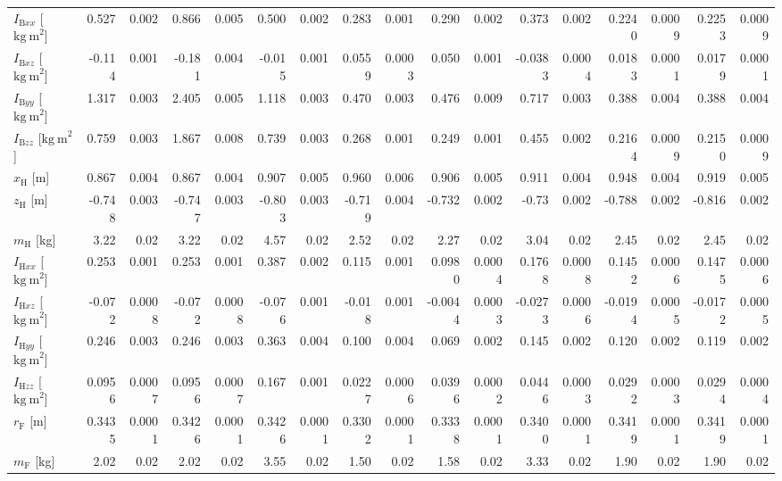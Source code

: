 \documentclass[../report/parameterReport.tex]{subfiles}
\begin{document}
\begin{landscape}
\begin{table}[tb]
\begin{center}
{\begin{tabular}{l|rr|rr|rr|rr|rr|rr|rr|rr}
$I_{\mathrm{B}xx}$ [$\mathrm{kg\ m}^2$] & 0.527 & 0.002 & 0.866 & 0.005 & 0.500 & 0.002 & 0.283 & 0.001 & 0.290 & 0.002 & 0.373 & 0.002 & 0.2240 & 0.0009 & 0.2253 & 0.0009\\
$I_{\mathrm{B}xz}$ [$\mathrm{kg\ m}^2$] & -0.114 & 0.001 & -0.181 & 0.004 & -0.015 & 0.001 & 0.0559 & 0.0003 & 0.050 & 0.001 & -0.0383 & 0.0004 & 0.0183 & 0.0001 & 0.0179 & 0.0001\\
$I_{\mathrm{B}yy}$ [$\mathrm{kg\ m}^2$] & 1.317 & 0.003 & 2.405 & 0.005 & 1.118 & 0.003 & 0.470 & 0.003 & 0.476 & 0.009 & 0.717 & 0.003 & 0.388 & 0.004 & 0.388 & 0.004\\
$I_{\mathrm{B}zz}$ [$\mathrm{kg\ m}^2$] & 0.759 & 0.003 & 1.867 & 0.008 & 0.739 & 0.003 & 0.268 & 0.001 & 0.249 & 0.001 & 0.455 & 0.002 & 0.2164 & 0.0009 & 0.2150 & 0.0009\\
\emph{$x_\mathrm{H}$} [m] & 0.867 & 0.004 & 0.867 & 0.004 & 0.907 & 0.005 & 0.960 & 0.006 & 0.906 & 0.005 & 0.911 & 0.004 & 0.948 & 0.004 & 0.919 & 0.005\\
\emph{$z_\mathrm{H}$} [m] & -0.748 & 0.003 & -0.747 & 0.003 & -0.803 & 0.003 & -0.719 & 0.004 & -0.732 & 0.002 & -0.73 & 0.002 & -0.788 & 0.002 & -0.816 & 0.002\\
\emph{$m_\mathrm{H}$} [kg] & 3.22 & 0.02 & 3.22 & 0.02 & 4.57 & 0.02 & 2.52 & 0.02 & 2.27 & 0.02 & 3.04 & 0.02 & 2.45 & 0.02 & 2.45 & 0.02\\
$I_{\mathrm{H}xx}$ [$\mathrm{kg\ m}^2$] & 0.253 & 0.001 & 0.253 & 0.001 & 0.387 & 0.002 & 0.115 & 0.001 & 0.0980 & 0.0004 & 0.1768 & 0.0008 & 0.1452 & 0.0006 & 0.1475 & 0.0006\\
$I_{\mathrm{H}xz}$ [$\mathrm{kg\ m}^2$] & -0.072 & 0.0008 & -0.072 & 0.0008 & -0.076 & 0.001 & -0.018 & 0.001 & -0.0044 & 0.0003 & -0.0273 & 0.0006 & -0.0194 & 0.0005 & -0.0172 & 0.0005\\
$I_{\mathrm{H}yy}$ [$\mathrm{kg\ m}^2$] & 0.246 & 0.003 & 0.246 & 0.003 & 0.363 & 0.004 & 0.100 & 0.004 & 0.069 & 0.002 & 0.145 & 0.002 & 0.120 & 0.002 & 0.119 & 0.002\\
$I_{\mathrm{H}zz}$ [$\mathrm{kg\ m}^2$] & 0.0956 & 0.0007 & 0.0956 & 0.0007 & 0.167 & 0.001 & 0.0227 & 0.0006 & 0.0396 & 0.0002 & 0.0446 & 0.0003 & 0.0292 & 0.0003 & 0.0294 & 0.0004\\
\emph{$r_\mathrm{F}$} [m] & 0.3435 & 0.0001 & 0.3426 & 0.0001 & 0.3426 & 0.0001 & 0.3302 & 0.0001 & 0.3338 & 0.0001 & 0.3400 & 0.0001 & 0.3419 & 0.0001 & 0.3419 & 0.0001\\
\emph{$m_\mathrm{F}$} [kg] & 2.02 & 0.02 & 2.02 & 0.02 & 3.55 & 0.02 & 1.50 & 0.02 & 1.58 & 0.02 & 3.33 & 0.02 & 1.90 & 0.02 & 1.90 & 0.02\\

\end{tabular}}
\end{center}
\end{table}
\end{landscape}
\end{document}
